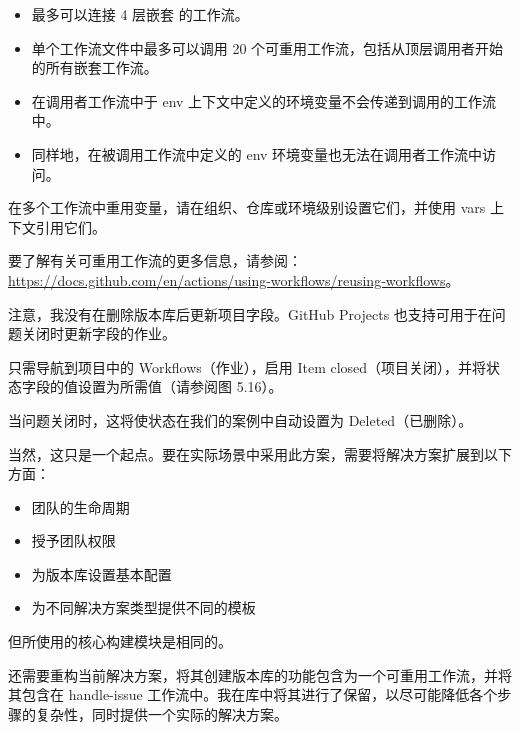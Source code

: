 \begin{itemize}
\item 
最多可以连接 4 层嵌套 的工作流。

\item 
单个工作流文件中最多可以调用 20 个可重用工作流，包括从顶层调用者开始的所有嵌套工作流。

\item 
在调用者工作流中于 env 上下文中定义的环境变量不会传递到调用的工作流中。

\item 
同样地，在被调用工作流中定义的 env 环境变量也无法在调用者工作流中访问。
\end{itemize}

在多个工作流中重用变量，请在组织、仓库或环境级别设置它们，并使用 vars 上下文引用它们。

要了解有关可重用工作流的更多信息，请参阅：\url{https://docs.github.com/en/actions/using-workflows/reusing-workflows}。

注意，我没有在删除版本库后更新项目字段。GitHub Projects 也支持可用于在问题关闭时更新字段的作业。

只需导航到项目中的 Workflows（作业），启用 Item closed（项目关闭），并将状态字段的值设置为所需值（请参阅图 5.16）。


当问题关闭时，这将使状态在我们的案例中自动设置为 Deleted（已删除）。


当然，这只是一个起点。要在实际场景中采用此方案，需要将解决方案扩展到以下方面：

\begin{itemize}
\item 
团队的生命周期

\item 
授予团队权限

\item 
为版本库设置基本配置

\item 
为不同解决方案类型提供不同的模板
\end{itemize}

但所使用的核心构建模块是相同的。

还需要重构当前解决方案，将其创建版本库的功能包含为一个可重用工作流，并将其包含在 handle-issue 工作流中。我在库中将其进行了保留，以尽可能降低各个步骤的复杂性，同时提供一个实际的解决方案。



















